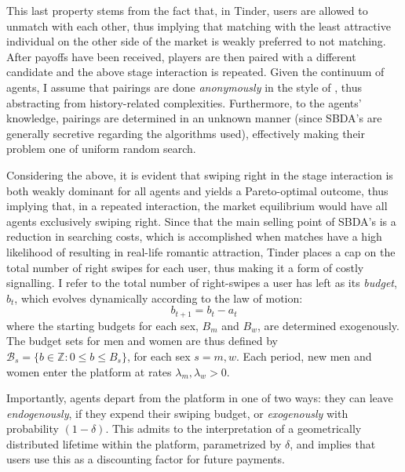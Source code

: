 This last property stems from the fact that, in Tinder, users are allowed to unmatch with each other, thus implying that matching with the least attractive individual on the other side of the market is weakly preferred to not matching. 
After payoffs have been received, players are then paired with a different candidate and the above stage interaction is repeated. Given the continuum of agents, I assume that pairings are done \textit{anonymously} in the style of \cite{jovanovic1988anonymous}, thus abstracting from history-related complexities.
Furthermore, to the agents' knowledge, pairings are determined in an unknown manner (since SBDA's are generally secretive regarding the algorithms used), effectively making their problem one of uniform random search.

Considering the above, it is evident that swiping right in the stage interaction is both weakly dominant for all agents and yields a Pareto-optimal outcome, thus implying that, in a repeated interaction, the market equilibrium would have all agents exclusively swiping right. Since that the main selling point of SBDA's is a reduction in searching costs, which is accomplished when matches have a high likelihood of resulting in real-life romantic attraction, Tinder places a cap on the total number of right swipes for each user, thus making it a form of costly signalling. I refer to the total number of right-swipes a user has left as its \textit{budget}, $b_t$, which evolves dynamically according to the law of motion:
$$
  b_{t+1}= b_{t}- a_{t}
$$
where the starting budgets for each sex, $B_m$ and $B_w$, are determined exogenously. The budget sets for men and women are thus defined by $\mathcal{B}_{s}=\{b \in \mathbb{Z} : 0\leq b \leq B_s\}$, for each sex $s=m,w$. Each period, new men and women enter the platform at rates $\lambda_m, \lambda_w>0$.
\begin{comment}
    , with their attractiveness drawn i.i.d from distributions with cumulative distribution functions $F_m$ and $F_w$, respectively
\end{comment}
Importantly, agents depart from the platform in one of two ways: they can leave \textit{endogenously}, if they expend their swiping budget, or \textit{exogenously} with probability $(1-\delta)$. This admits to the interpretation of a geometrically distributed lifetime within the platform, parametrized by $\delta$, and implies that users use this as a discounting factor for future payments.

